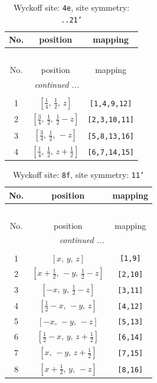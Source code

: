 \documentclass[fleqn,8pt]{jsarticle}
\begin{document}
\renewcommand{\arraystretch}{1.2}
\begin{longtable}{ccc}
\caption{Wyckoff site: {\tt 4e}, site symmetry: {\tt ..21'}}
 \\
 \hline \hline
No. & position & mapping \\ \hline \endfirsthead

\multicolumn{2}{l}{\tablename\ \thetable{}} \\
 \hline \hline
No. & position & mapping \\ \hline \endhead

 \hline \hline
\multicolumn{2}{r}{\footnotesize\it continued ...} \\ \endfoot

 \hline \hline
\multicolumn{2}{r}{} \\ \endlastfoot

1 & $\left[ \frac{1}{4},\, \frac{1}{2},\, z \right]$ & {\tt [1,4,9,12]} \\ \hline
2 & $\left[ \frac{3}{4},\, \frac{1}{2},\, \frac{1}{2} - z \right]$ & {\tt [2,3,10,11]} \\ \hline
3 & $\left[ \frac{3}{4},\, \frac{1}{2},\, - z \right]$ & {\tt [5,8,13,16]} \\ \hline
4 & $\left[ \frac{1}{4},\, \frac{1}{2},\, z + \frac{1}{2} \right]$ & {\tt [6,7,14,15]} \\
\end{longtable}
\renewcommand{\arraystretch}{1.2}
\begin{longtable}{ccc}
\caption{Wyckoff site: {\tt 8f}, site symmetry: {\tt 11'}}
 \\
 \hline \hline
No. & position & mapping \\ \hline \endfirsthead

\multicolumn{2}{l}{\tablename\ \thetable{}} \\
 \hline \hline
No. & position & mapping \\ \hline \endhead

 \hline \hline
\multicolumn{2}{r}{\footnotesize\it continued ...} \\ \endfoot

 \hline \hline
\multicolumn{2}{r}{} \\ \endlastfoot

1 & $\left[ x,\, y,\, z \right]$ & {\tt [1,9]} \\ \hline
2 & $\left[ x + \frac{1}{2},\, - y,\, \frac{1}{2} - z \right]$ & {\tt [2,10]} \\ \hline
3 & $\left[ - x,\, y,\, \frac{1}{2} - z \right]$ & {\tt [3,11]} \\ \hline
4 & $\left[ \frac{1}{2} - x,\, - y,\, z \right]$ & {\tt [4,12]} \\ \hline
5 & $\left[ - x,\, - y,\, - z \right]$ & {\tt [5,13]} \\ \hline
6 & $\left[ \frac{1}{2} - x,\, y,\, z + \frac{1}{2} \right]$ & {\tt [6,14]} \\ \hline
7 & $\left[ x,\, - y,\, z + \frac{1}{2} \right]$ & {\tt [7,15]} \\ \hline
8 & $\left[ x + \frac{1}{2},\, y,\, - z \right]$ & {\tt [8,16]} \\
\end{longtable}
\end{document}
